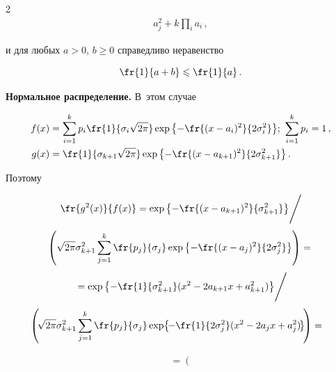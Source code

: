 \begin{multicols}{2}
\begin{align*}
a_j^2+k\prod\limits_i a_i\,,

\end{align*}

и для любых $a>0$, $b\geqslant0$ справедливо неравенство

$$

\fr{1}{a+b}\leqslant\fr{1}{a}\,.

$$



\textbf{Нормальное распределение.} В~этом случае

\begin{align*}

f(x)&=\sum\limits_{i=1}^{k}p_i\fr{1}{\sigma_i\sqrt{2\pi}}

\exp{\left\{-\fr{(x-a_i)^2}{2\sigma_i^2}\right\}};\

\sum\limits_{i=1}^{k}p_i=1\,,\\

g(x)&=\fr{1}{\sigma_{k+1}\sqrt{2\pi}}\exp{\left\{-\fr{(x-a_{k+1})^2}{2\sigma_{k+1}^2}\right\}}\,.

\end{align*}

Поэтому

\begin{multline*}

\fr{g^2(x)}{f(x)}=

{\exp\left\{-\fr{(x-a_{k+1})^2}{\sigma_{k+1}^2}\right\}}\Bigg/\\[3pt]

\left({\sqrt{2\pi}\sigma^2_{k+1}\sum_{j=1}^k\fr{p_j}{\sigma_j}

\exp\left\{-\fr{(x-a_j)^2}{2\sigma_j^2}\right\}}\right)={}\\[3pt]

{}={\exp\left\{-\fr{1}{\sigma_{k+1}^2}(x^2-2a_{k+1}x+a_{k+1}^2)\right\}}\Bigg /\\[3pt]

\!\!\!\!\left(\!{\sqrt{2\pi}\sigma^2_{k+1}

\sum_{j=1}^k\fr{p_j}{\sigma_j}

\exp\!\left\{\!-\fr{1}{2\sigma_j^2}(x^2-2a_jx+a_j^2)\!\right\}}\!\right)={}

\end{multline*}





\noindent

\begin{multline}

{}=\left(


\end{multline}
\end{multicols}
